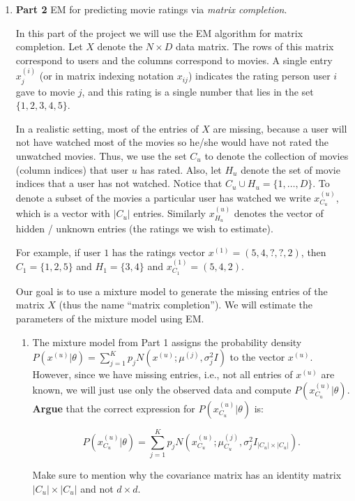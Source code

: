 \begin{enumerate}
\item {\bf Part 2} EM for predicting movie ratings via \emph{matrix completion}.

In this part of the project we will use the EM algorithm for matrix completion. Let $X$ denote the $N \times D$ data matrix. The rows of this matrix correspond to users and the columns correspond to movies. A single entry $x^{(i)}_{j}$ (or in matrix indexing notation $x_{ij}$) indicates the rating person user $i$ gave to movie $j$, and this rating is a single number that lies in the set $\{1,2,3,4,5\}$.

In a realistic setting, most of the entries of $X$ are missing, because a user will not have watched most of the movies so he/she would have not rated the unwatched movies. Thus, we use the set $C_{u}$ to denote the collection of movies (column indices) that user $u$ has rated. Also, let $H_{u}$ denote the set of movie indices that a user has not watched. Notice that $C_{u} \cup H_{u} = \{1,\ldots,D\}$. To denote a subset of the movies a particular user has watched we write $x_{C_u}^{(u)}$, which is a vector with $|C_u|$ entries. Similarly $x_{H_u}^{(u)}$ denotes the vector of hidden / unknown entries (the ratings we wish to estimate).

For example, if user $1$ has the ratings vector $x^{(1)} =  (5, 4, ?, ?, 2)$, then $C_{1} = \{1, 2, 5\}$ and $H_{1} = \{ 3, 4\}$ and $x^{(1)}_{C_1} = (5, 4, 2)$.

Our goal is to use a mixture model to generate the missing entries of the matrix $X$ (thus the name ``matrix completion''). We will estimate the parameters of the mixture model using EM.

\begin{enumerate}
\item The mixture model from Part 1 assigns the probability density $P(x^{(u)} | \theta) = \sum^{K}_{j=1} p_j N(x^{(u)}; \mu^{(j)}, \sigma^2_j I)$ to the vector $x^{(u)}$. However, since we have missing entries, i.e., not all entries of $x^{(u)}$ are known, we will just use only the observed data and compute $P(x^{(u)}_{C_u} | \theta)$. \textbf{Argue} that the correct expression for $P(x^{(u)}_{C_u}  | \theta)$ is:

 $$P(x^{(u)}_{C_u}  | \theta) = \sum^{K}_{j=1} p_j N(x^{(u)}_{C_u} ; \mu^{(j)}_{C_u} , \sigma^2_j I_{|C_u| \times |C_u|}).$$

Make sure to mention why the covariance matrix has an identity matrix $ |C_u| \times |C_u| $ and not $ d \times d $.


\end{enumerate}
\end{enumerate}
